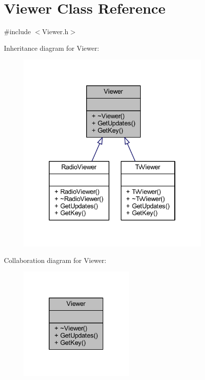 \hypertarget{class_viewer}{}\section{Viewer Class Reference}
\label{class_viewer}


{\ttfamily \#include $<$Viewer.\+h$>$}



Inheritance diagram for Viewer\+:
\nopagebreak
\begin{figure}[H]
\begin{center}
\leavevmode
\includegraphics[width=274pt]{class_viewer__inherit__graph}
\end{center}
\end{figure}


Collaboration diagram for Viewer\+:
\nopagebreak
\begin{figure}[H]
\begin{center}
\leavevmode
\includegraphics[width=163pt]{class_viewer__coll__graph}
\end{center}
\end{figure}
